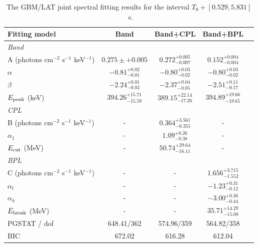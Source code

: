 \documentclass[twocolumn]{aastex631}
\begin{document}
\begin{table}
\begin{small}
\caption{The GBM/LAT joint spectral fitting results for the interval $T_0 + [0.529,5.831]$~s.}
\label{tab:spec_all}
\begin{center}
\begin{tabular}{p{4.5cm}cccc}
\hline \hline
Fitting model & Band  &  Band+CPL & Band+BPL  \\ \hline \hline
\multicolumn{4}{l}{\it Band }\\
A (photons cm$^{-2}$ s$^{-1}$ keV$^{-1}$) 
             & $0.275\pm+0.005$          & $0.272_{-0.007}^{+0.005}$ & $0.152_{-0.004}^{+0.004}$ \\
$\alpha$     & $-0.81_{-0.01}^{+0.02}$   & $-0.80_{-0.02}^{+0.03}$   & $-0.80_{-0.02}^{+0.03}$   \\
$\beta$      & $-2.24_{-0.02}^{+0.01}$   & $-2.37_{-0.05}^{+0.04}$   & $-2.51_{-0.17}^{+0.11}$   \\     
$E_{\rm{peak}}$ (keV) &    $394.26_{-15.59}^{+15.71}$  & $389.15_{-17.26}^{+22.14}$   & $394.89_{-19.65}^{+19.66}$  \\\hline

\multicolumn{4}{l}{\it CPL}\\
B (photons cm$^{-2}$ s$^{-1}$ keV$^{-1}$)      &-&    $0.364_{-0.355}^{+3.561}$         &-  \\
$\alpha_1$                                     &-&    $1.09_{-0.38}^{+0.26}$            &-  \\ 
$E_{\rm cut}$ (MeV)                            &-&    $50.74_{-16.11}^{+29.64}$         &-  \\ \hline

\multicolumn{4}{l}{\it BPL}\\
C (photons cm$^{-2}$ s$^{-1}$ keV$^{-1}$)      &-&-&    $1.656_{-1.552}^{+3.715}$ \\
$\alpha_l$                                     &-&-&    $-1.23_{-0.12}^{+0.31}$               \\ 
$\alpha_h$                                     &-&-&    $-3.00_{-0.44}^{+0.36}$               \\ 
$E_{\rm break}$ (MeV)                            &-&-&    $35.71_{-15.08}^{+14.29}$             \\ 
\hline

\hline 
PGSTAT / dof     &  648.41/362 & 574.96/359 & 564.82/358  \\
BIC &       672.02      &   616.28   &  612.04         \\
\hline \hline
\end{tabular}
\end{center}
\end{small}
\end{table}
\end{document}
